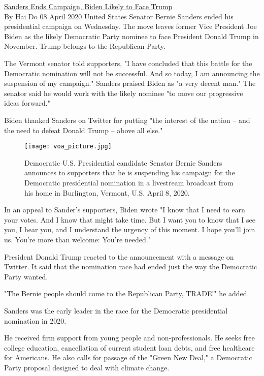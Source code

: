 \href{https://www.51voa.com/VOA_Special_English/sanders-ends-campaign-biden-likely-to-face-trump-84288.html}{Sanders Ends Campaign, Biden Likely to Face Trump} \\

By Hai Do
08 April 2020
United States Senator Bernie Sanders ended his presidential campaign on Wednesday. The move leaves former Vice President Joe Biden as the likely Democratic Party nominee to face President Donald Trump in November. Trump belongs to the Republican Party.

The Vermont senator told supporters, "I have concluded that this battle for the Democratic nomination will not be successful. And so today, I am announcing the suspension of my campaign." Sanders praised Biden as "a very decent man." The senator said he would work with the likely nominee "to move our progressive ideas forward."

Biden thanked Sanders on Twitter for putting "the interest of the nation – and the need to defeat Donald Trump – above all else."

\begin{figure}[h] %
    \centering
    \texttt{[image: voa\_picture.jpg]}
    \caption{Democratic U.S. Presidential candidate Senator Bernie Sanders announces to supporters that he is suspending his campaign for the Democratic presidential nomination in a livestream broadcast from his home in Burlington, Vermont, U.S. April 8, 2020.}
\end{figure}

In an appeal to Sander's supporters, Biden wrote "I know that I need to earn your votes. And I know that might take time. But I want you to know that I see you, I hear you, and I understand the urgency of this moment. I hope you'll join us. You're more than welcome: You're needed."

President Donald Trump reacted to the announcement with a message on Twitter. It said that the nomination race had ended just the way the Democratic Party wanted.

"The Bernie people should come to the Republican Party, TRADE!" he added.

Sanders was the early leader in the race for the Democratic presidential nomination in 2020.

He received firm support from young people and non-professionals. He seeks free college education, cancellation of current student loan debts, and free healthcare for Americans. He also calls for passage of the "Green New Deal," a Democratic Party proposal designed to deal with climate change.

